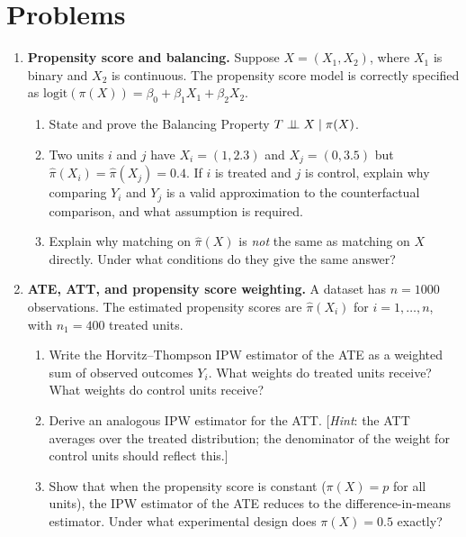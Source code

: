 \documentclass[master.tex]{subfiles}
\begin{document}
\section*{Problems}

\begin{enumerate}

\item \textbf{Propensity score and balancing.}
  Suppose $X = (X_1, X_2)$, where $X_1$ is binary and $X_2$ is
  continuous.  The propensity score model is correctly specified as
  $\mathrm{logit}(\pi(X)) = \beta_0 + \beta_1 X_1 + \beta_2 X_2$.
  \begin{enumerate}
    \item State and prove the Balancing Property $T \perp\!\!\!\perp X \mid \pi(X)$.
    \item Two units $i$ and $j$ have $X_i = (1, 2.3)$ and
      $X_j = (0, 3.5)$ but $\hat\pi(X_i) = \hat\pi(X_j) = 0.4$.
      If $i$ is treated and $j$ is control, explain why comparing $Y_i$
      and $Y_j$ is a valid approximation to the counterfactual
      comparison, and what assumption is required.
    \item Explain why matching on $\hat\pi(X)$ is \emph{not} the same
      as matching on $X$ directly.  Under what conditions do they give
      the same answer?
  \end{enumerate}

\item \textbf{ATE, ATT, and propensity score weighting.}
  A dataset has $n = 1000$ observations.  The estimated propensity
  scores are $\hat\pi(X_i)$ for $i = 1, \ldots, n$, with $n_1 = 400$
  treated units.
  \begin{enumerate}
    \item Write the Horvitz--Thompson IPW estimator of the ATE as a
      weighted sum of observed outcomes $Y_i$.  What weights do treated
      units receive?  What weights do control units receive?
    \item Derive an analogous IPW estimator for the ATT.
      [\emph{Hint}: the ATT averages over the treated distribution; the
      denominator of the weight for control units should reflect this.]
    \item Show that when the propensity score is constant
      ($\pi(X) = p$ for all units), the IPW estimator of the ATE reduces
      to the difference-in-means estimator.  Under what experimental
      design does $\pi(X) = 0.5$ exactly?
  \end{enumerate}


\end{enumerate}
\end{document}
